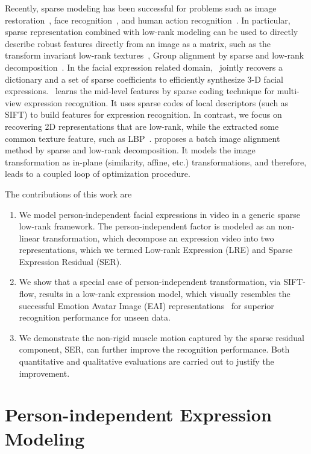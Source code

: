 \documentclass[journal]{IEEEtran}
\begin{document}
Recently, sparse modeling has been successful for problems such as image restoration~\cite{Yang_CVPR08}, face recognition~\cite{Wright_PAMI09}, and human action recognition~\cite{Qiu_ICCV11}. In particular, sparse representation combined with low-rank modeling can be used to directly describe robust features directly from an image as a matrix, such as the transform invariant low-rank textures~\cite{Zhang_IJCV12}, Group alignment by sparse and low-rank decomposition~\cite{Peng_PAMI12}. In the facial expression related domain,~\cite{Lin12} jointly recovers a dictionary and a set of sparse coefficients to efficiently synthesize 3-D facial expressions.~\cite{Tariq12} learns the mid-level features by sparse coding technique for multi-view expression recognition. It uses sparse codes of local descriptors (such as SIFT) to build features for expression recognition. In contrast, we focus on recovering 2D representations that are low-rank, while the extracted some common texture feature, such as LBP~\cite{Ojala_PAMI02}. \cite{Peng_CVPR10} proposes a batch image alignment method by sparse and low-rank decomposition. It models the image transformation as in-plane (similarity, affine, etc.) transformations, and therefore, leads to a coupled loop of optimization procedure. 

The contributions of this work are 
\begin{enumerate}
\item We model person-independent facial expressions in video in a generic sparse low-rank framework. The person-independent factor is modeled as an non-linear transformation, which decompose an expression video into two representations, which we termed Low-rank Expression (LRE) and Sparse Expression Residual (SER).

\item We show that a special case of person-independent transformation, via SIFT-flow, results in a low-rank expression model, which visually resembles the successful Emotion Avatar Image (EAI) representations~\cite{Yang_SMCB12} for superior recognition performance for unseen data.

\item We demonstrate the non-rigid muscle motion captured by the sparse residual component, SER, can further improve the recognition performance. Both quantitative and qualitative evaluations are carried out to justify the improvement. 

\end{enumerate}

\section{Person-independent Expression Modeling\label{sec:decompose}}
\end{document}
